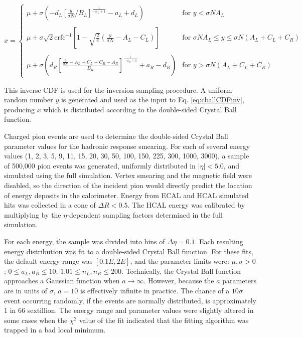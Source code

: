 \begin{equation}
x = \begin{cases}
\mu + \sigma \left(-d_{L}\left[\frac{y}{\sigma N}/B_{L}\right]^{\frac{1}{-n_{L}+1}}-a_{L}+d_{L} \right) & \text{for $y < \sigma N A_{L}$} \\
\\
\mu + \sigma \sqrt{2} \text{erfc}^{-1}\left[1-\sqrt{\frac{2}{\pi}}\left(\frac{y}{\sigma N}-A_{L}-C_{L}\right)\right] & \text{for $\sigma N A_{L} \leq y \leq \sigma N (A_{L} + C_{L} + C_{R})$} \\
\\
\mu + \sigma \left(d_{R}\left[\frac{\frac{y}{\sigma N} - A_{L} - C_{L} - C_{R} - A_{R}}{B_{R}}\right]^{\frac{1}{-n_{R}+1}}+a_{R}-d_{R}\right) & \text{for $y > \sigma N (A_{L} + C_{L} + C_{R})$}
\end{cases}
\label{eq:cballCDFinv}
\end{equation}

This inverse CDF is used for the inversion sampling procedure. A uniform random number $y$ is generated and used as the input to Eq. \eqref{eq:cballCDFinv}, producing $x$ which is distributed according to the double-sided Crystal Ball function.

Charged pion events are used to determine the double-sided Crystal Ball parameter values for the hadronic response smearing. For each of several energy values (1, 2, 3, 5, 9, 11, 15, 20, 30, 50, 100, 150, 225, 300, 1000, 3000\GeV), a sample of 500,000 pion events was generated, uniformly distributed in $|\eta|<5.0$, and simulated using the full simulation. Vertex smearing and the magnetic field were disabled, so the direction of the incident pion would directly predict the location of energy deposits in the calorimeter. Energy from ECAL and HCAL simulated hits was collected in a cone of $\Delta R < 0.5$. The HCAL energy was calibrated by multiplying by the $\eta$-dependent sampling factors determined in the full simulation.

For each energy, the sample was divided into bins of $\Delta \eta = 0.1$. Each resulting energy distribution was fit to a double-sided Crystal Ball function. For these fits, the default energy range was $[0.1E,2E]$, and the parameter limits were: $\mu, \sigma > 0$; $0 \leq a_{L}, a_{R} \leq 10$; $1.01 \leq n_{L}, n_{R} \leq 200$. Technically, the Crystal Ball function approaches a Gaussian function when $a \rightarrow \infty$. However, because the $a$ parameters are in units of $\sigma$, $a = 10$ is effectively infinite in practice. The chance of a $10\sigma$ event occurring randomly, if the events are normally distributed, is approximately 1 in 66 sextillion. The energy range and parameter values were slightly altered in some cases when the $\chi^{2}$ value of the fit indicated that the fitting algorithm was trapped in a bad local minimum.

